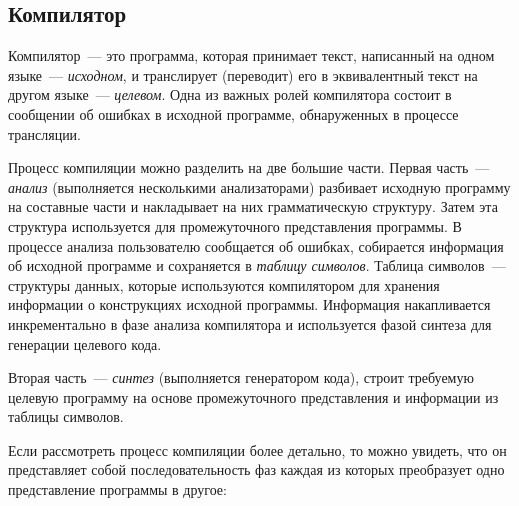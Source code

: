 \subsection{Компилятор} \label{sub111}

Компилятор~--- это программа, которая  принимает текст, написанный на одном языке~--- \textit{исходном}, и транслирует (переводит) его в эквивалентный текст на другом языке~--- \textit{целевом}. Одна из важных ролей компилятора состоит в сообщении об ошибках в исходной программе, обнаруженных в процессе трансляции.

Процесс компиляции можно разделить на две большие части. Первая часть~--- \textit{анализ} (выполняется несколькими анализаторами) разбивает исходную программу на составные части и накладывает на них грамматическую структуру. Затем эта структура используется для промежуточного представления программы. В процессе анализа пользователю сообщается об ошибках, собирается информация об исходной программе и сохраняется в \textit{таблицу символов}. Таблица символов~--- структуры данных, которые используются компилятором для хранения информации о конструкциях исходной программы. Информация накапливается инкрементально в фазе анализа компилятора и используется фазой синтеза для генерации целевого кода.

Вторая часть~--- \textit{синтез} (выполняется генератором кода), строит требуемую целевую программу на основе промежуточного представления и информации из таблицы символов.

Если рассмотреть процесс компиляции более детально, то можно увидеть, что он представляет собой последовательность фаз каждая из которых преобразует одно представление программы в другое:


